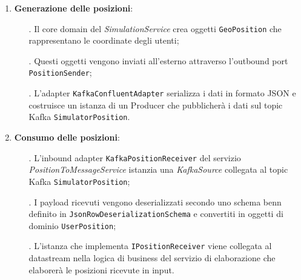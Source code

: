 \documentclass[10pt]{article}
\begin{document}
    \begin{enumerate}
        \item \textbf{Generazione delle posizioni}:
        \begin{itemize}
            \item[.] Il core domain del \textit{SimulationService} crea oggetti \texttt{GeoPosition} che rappresentano le coordinate degli utenti;
            \item[.] Questi oggetti vengono inviati all'esterno attraverso l'outbound port \texttt{PositionSender};
            \item[.] L'adapter \texttt{KafkaConfluentAdapter} serializza i dati in formato JSON e  costruisce un istanza di un Producer che pubblicherà i dati sul topic Kafka \texttt{SimulatorPosition}.
        \end{itemize}

        \item \textbf{Consumo delle posizioni}:
        \begin{itemize}
            \item[.] L'inbound adapter \texttt{KafkaPositionReceiver} del servizio \textit{PositionToMessageService} istanzia una \textit{KafkaSource} collegata al topic Kafka \texttt{SimulatorPosition};
            \item[.] I payload ricevuti vengono deserializzati secondo uno schema benn definito in \texttt{JsonRowDeserializationSchema} e convertiti in oggetti di dominio \texttt{UserPosition};
            \item[.] L'istanza che implementa \texttt{IPositionReceiver} viene collegata al datastream nella logica di business del servizio di elaborazione che elaborerà le posizioni ricevute in input.
        \end{itemize}


\end{enumerate}
\end{document}

